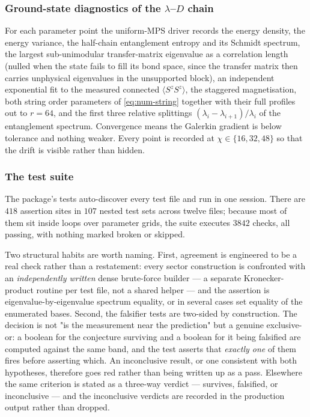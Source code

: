 \subsubsection{Ground-state diagnostics of the \texorpdfstring{$\lambda$--$D$}{lambda-D} chain}

For each parameter point the uniform-MPS driver records the energy density,
the energy variance, the half-chain entanglement entropy and its Schmidt
spectrum, the largest sub-unimodular transfer-matrix eigenvalue as a
correlation length (nulled when the state fails to fill its bond space, since
the transfer matrix then carries unphysical eigenvalues in the unsupported
block), an independent exponential fit to the measured connected
$\langle S^zS^z\rangle$, the staggered magnetisation, both string order
parameters of \cref{eq:num-string} together with their full profiles out to
$r=64$, and the first three relative splittings
$(\lambda_i-\lambda_{i+1})/\lambda_i$ of the entanglement spectrum.
Convergence means the Galerkin gradient is below tolerance and nothing
weaker. Every point is recorded at $\chi\in\{16,32,48\}$ so that the drift is
visible rather than hidden.

\subsubsection{The test suite}

The package's tests auto-discover every test file and run in one session.
There are $418$ assertion sites in $107$ nested test sets across twelve files;
because most of them sit inside loops over parameter grids, the suite executes
$3842$ checks, all passing, with nothing marked broken or skipped.

Two structural habits are worth naming. First, agreement is engineered to be a
real check rather than a restatement: every sector construction is confronted
with an \emph{independently written} dense brute-force builder --- a separate
Kronecker-product routine per test file, not a shared helper --- and the
assertion is eigenvalue-by-eigenvalue spectrum equality, or in several cases
set equality of the enumerated bases. Second, the falsifier tests are
two-sided by construction. The decision is not "is the measurement near the
prediction" but a genuine exclusive-or: a boolean for the conjecture surviving
and a boolean for it being falsified are computed against the same band, and
the test asserts that \emph{exactly one} of them fires before asserting which.
An inconclusive result, or one consistent with both hypotheses, therefore goes
red rather than being written up as a pass. Elsewhere the same criterion is
stated as a three-way verdict --- survives, falsified, or inconclusive --- and
the inconclusive verdicts are recorded in the production output rather than
dropped.

